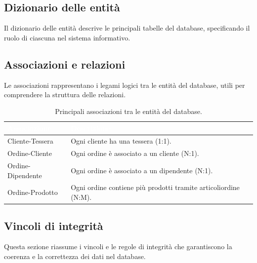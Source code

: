 \documentclass[a4paper,12pt]{article}
\begin{document}
\vspace{1.5em}
\subsection{Dizionario delle entità}
\noindent
Il dizionario delle entità descrive le principali tabelle del database, specificando il ruolo di ciascuna nel sistema informativo.


\vspace{1.5em}
\subsection{Associazioni e relazioni}
\noindent
Le associazioni rappresentano i legami logici tra le entità del database, utili per comprendere la struttura delle relazioni.

\renewcommand{\arraystretch}{1.3}
\begin{table}[htbp]
\centering
\setlength{\tabcolsep}{8pt}
\begin{tabular}{|>{\centering\arraybackslash}m{3.5cm}|>{\raggedright\arraybackslash}m{9.5cm}|}
\hline
\rowcolor{myblue}\textcolor{white}{\textbf{Associazione}} & \textcolor{white}{\textbf{Descrizione}} \\
\hline
\rowcolor{mygray} Cliente-Tessera & Ogni cliente ha una tessera (1:1). \\
Ordine-Cliente & Ogni ordine è associato a un cliente (N:1). \\
\rowcolor{mygray} Ordine-Dipendente & Ogni ordine è associato a un dipendente (N:1). \\
Ordine-Prodotto & Ogni ordine contiene più prodotti tramite articoliordine (N:M). \\
\hline
\end{tabular}
\caption{Principali associazioni tra le entità del database.}
\end{table}

\vspace{1.5em}
\subsection{Vincoli di integrità}
\noindent
Questa sezione riassume i vincoli e le regole di integrità che garantiscono la coerenza e la correttezza dei dati nel database.
\end{document}
